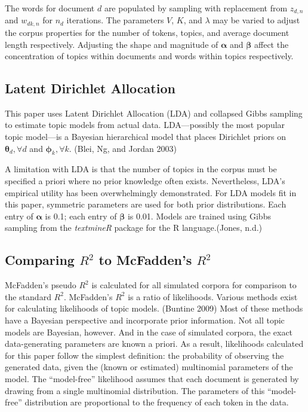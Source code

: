 \documentclass[conference,final,]{IEEEtran}
\begin{document}
The words for document \(d\) are populated by sampling with replacement
from \(z_{d,n}\) and \(w_{dk,n}\) for \(n_d\) iterations. The parameters
\(V\), \(K\), and \(\lambda\) may be varied to adjust the corpus
properties for the number of tokens, topics, and average document length
respectively. Adjusting the shape and magnitude of \(\boldsymbol\alpha\)
and \(\boldsymbol\beta\) affect the concentration of topics within
documents and words within topics respectively.

\hypertarget{latent-dirichlet-allocation}{%
\subsection{Latent Dirichlet
Allocation}\label{latent-dirichlet-allocation}}

This paper uses Latent Dirichlet Allocation (LDA) and collapsed Gibbs
sampling to estimate topic models from actual data. LDA---possibly the
most popular topic model---is a Bayesian hierarchical model that places
Dirichlet priors on \(\boldsymbol\theta_d, \forall d\) and
\(\boldsymbol\phi_k, \forall k\). (Blei, Ng, and Jordan 2003)

A limitation with LDA is that the number of topics in the corpus must be
specified a priori where no prior knowledge often exists. Nevertheless,
LDA's empirical utility has been overwhelmingly demonstrated. For LDA
models fit in this paper, symmetric parameters are used for both prior
distributions. Each entry of \(\boldsymbol\alpha\) is 0.1; each entry of
\(\boldsymbol\beta\) is 0.01. Models are trained using Gibbs sampling
from the \emph{textmineR} package for the R language.(Jones, n.d.)

\hypertarget{comparing-r2-to-mcfaddens-r2}{%
\subsection{\texorpdfstring{Comparing \(R^2\) to McFadden's
\(R^2\)}{Comparing R\^{}2 to McFadden's R\^{}2}}\label{comparing-r2-to-mcfaddens-r2}}

McFadden's pseudo \(R^2\) is calculated for all simulated corpora for
comparison to the standard \(R^2\). McFadden's \(R^2\) is a ratio of
likelihoods. Various methods exist for calculating likelihoods of topic
models. (Buntine 2009) Most of these methods have a Bayesian perspective
and incorporate prior information. Not all topic models are Bayesian,
however. And in the case of simulated corpora, the exact data-generating
parameters are known a priori. As a result, likelihoods calculated for
this paper follow the simplest definition: the probability of observing
the generated data, given the (known or estimated) multinomial
parameters of the model. The ``model-free'' likelihood assumes that each
document is generated by drawing from a single multinomial distribution.
The parameters of this ``model-free'' distribution are proportional to
the frequency of each token in the data.
\end{document}
